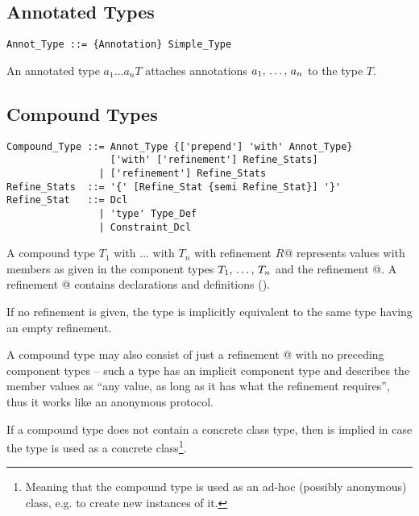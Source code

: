 \subsection{Annotated Types}

\syntax\begin{lstlisting}
Annot_Type ::= {Annotation} Simple_Type
\end{lstlisting}

An annotated type $a_1 \ldots a_n T$ attaches annotations $a_1 ,\, \ldots ,\, a_n$ to the type $T$. %






\subsection{Compound Types}
\label{sec:compound-types}

\syntax\begin{lstlisting}
Compound_Type ::= Annot_Type {['prepend'] 'with' Annot_Type} 
                  ['with' ['refinement'] Refine_Stats]
                | ['refinement'] Refine_Stats
Refine_Stats  ::= '{' [Refine_Stat {semi Refine_Stat}] '}'
Refine_Stat   ::= Dcl
                | 'type' Type_Def
                | Constraint_Dcl
\end{lstlisting} %

A compound type \lstinline@$T_1$ with $\ldots$ with $T_n$ with refinement {$R$}@ represents values with members as given in the component types $T_1 ,\, \ldots ,\, T_n$ and the refinement @. A refinement @ contains declarations and definitions (). 

If no refinement is given, the type is implicitly equivalent to the same type having an empty refinement. 

A compound type may also consist of just a refinement @ with no preceding component types -- such a type has an implicit component type  and describes the member values as ``any value, as long as it has what the refinement requires'', thus it works like an anonymous protocol. 

If a compound type does not contain a concrete class type, then  is implied in case the type is used as a concrete class\footnote{Meaning that the compound type is used as an ad-hoc (possibly anonymous) class, e.g. to create new instances of it.}.

